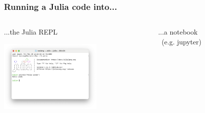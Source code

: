 \documentclass[]{beamer}
\begin{document}
\begin{frame}
  \frametitle{Running a Julia code into...}
\vspace{3mm}

%            
%            
%                                    
%            
%            
         
      
    \begin{columns}
      \begin{column}{0.3\textwidth}
      \vspace{0mm}
      ...the Julia REPL
      
       \centerline{\includegraphics[angle=0,origin=c,height=35mm]{replLeeds.png}}      
       
       \vspace{15mm}
      \end{column}
      
      \begin{column}{0.33\textwidth}
      \vspace{5mm}
      
      ...a notebook \\ (e.g. jupyter)
      

\end{column}
\end{columns}
\end{frame}
\end{document}
